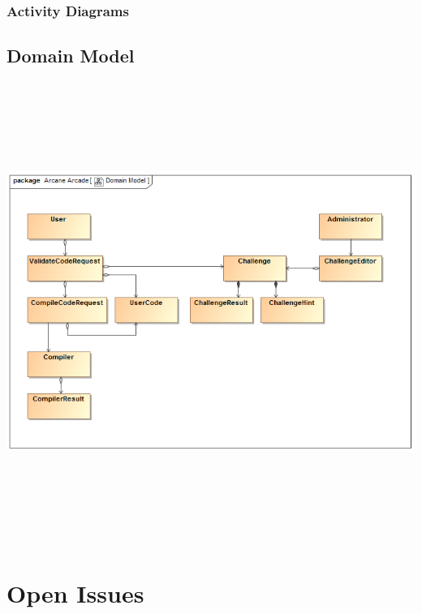 \documentclass[english]{article}
\begin{document}
		\subsubsection{Activity Diagrams}		
		
		\subsection{Domain Model}
			\includegraphics[width=15cm,height=15cm,keepaspectratio]{domainModel.png}
		

	\newpage
	\section{Open Issues}		


		
\end{document}
